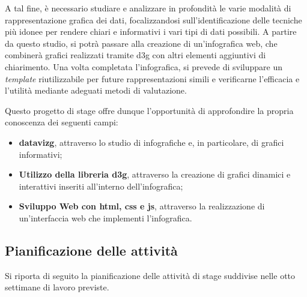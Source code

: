 A tal fine, è necessario studiare e analizzare in profondità le varie modalità di rappresentazione
grafica dei dati, focalizzandosi sull'identificazione delle tecniche più idonee per rendere chiari e
informativi i vari tipi di dati possibili. A partire da questo studio, si potrà passare alla creazione di un'infografica
web, che combinerà grafici realizzati tramite \gls{d3g} con altri elementi aggiuntivi di chiarimento. Una
volta completata l'infografica, si prevede di sviluppare un \emph{template} riutilizzabile per future rappresentazioni
simili e verificarne l'efficacia e l'utilità mediante adeguati metodi di valutazione. 

Questo progetto di stage offre dunque l'opportunità di approfondire la propria conoscenza dei seguenti campi:
\begin{itemize}
    \item \textbf{\gls{datavizg}}, attraverso lo studio di infografiche e, in particolare, di grafici informativi;
    \item \textbf{Utilizzo della libreria \gls{d3g}}, attraverso la creazione di grafici dinamici e interattivi inseriti all'interno dell'infografica;
    \item \textbf{Sviluppo Web con \gls{html}, \gls{css} e \gls{js}}, attraverso la realizzazione di un'interfaccia web che implementi l'infografica.
\end{itemize}


\subsection{Pianificazione delle attività}
Si riporta di seguito la pianificazione delle attività di stage suddivise 
nelle otto settimane di lavoro previste.

